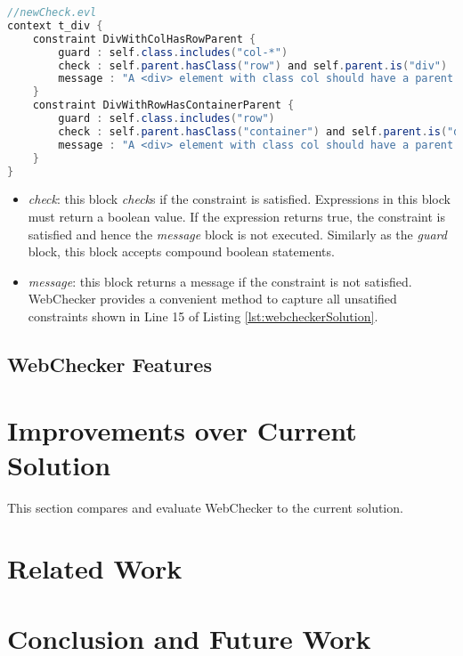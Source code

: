 \documentclass[conference]{IEEETran}
\begin{document}
\begin{lstlisting}[language=Java, caption=Enforcing Bootstrap Grid Rule by Using WebChecker, label={lst:webcheckerSolution}]
//newCheck.evl
context t_div { 
    constraint DivWithColHasRowParent {
        guard : self.class.includes("col-*")
        check : self.parent.hasClass("row") and self.parent.is("div")
        message : "A <div> element with class col should have a parent <div> element with class row."
    }
    constraint DivWithRowHasContainerParent {
        guard : self.class.includes("row")
        check : self.parent.hasClass("container") and self.parent.is("div")
        message : "A <div> element with class col should have a parent <div> element with class row."
    }
}

\end{lstlisting}

\begin{itemize}
\item \textit{check}: this block \textit{check}s if the constraint is satisfied. Expressions in this block must return a boolean value. If the expression returns true, the constraint is satisfied and hence the \textit{message} block is not executed. Similarly as the \textit{guard} block, this block accepts compound boolean statements.
\item \textit{message}: this block returns a message if the constraint is not satisfied. WebChecker provides a convenient method to capture all unsatified constraints shown in Line 15 of Listing \ref{lst:webcheckerSolution}.  
\end{itemize}

\subsection{WebChecker Features}



\section{Improvements over Current Solution}
This section compares and evaluate WebChecker to the current solution.

\section{Related Work}


\section{Conclusion and Future Work}


 

\end{document}
